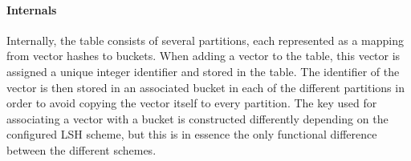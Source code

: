 \paragraph{Internals} Internally, the table consists of several partitions, each represented as a mapping from vector hashes to buckets. When adding a vector to the table, this vector is assigned a unique integer identifier and stored in the table. The identifier of the vector is then stored in an associated bucket in each of the different partitions in order to avoid copying the vector itself to every partition. The key used for associating a vector with a bucket is constructed differently depending on the configured LSH scheme, but this is in essence the only functional difference between the different schemes.
